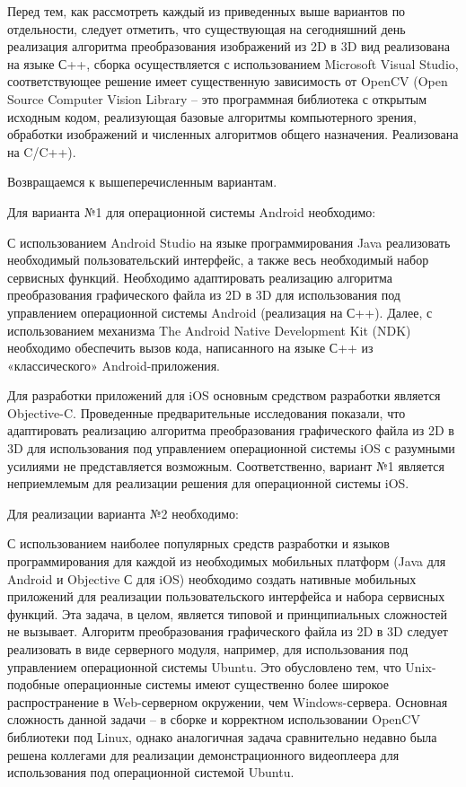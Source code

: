 Перед тем, как рассмотреть каждый из приведенных выше вариантов по отдельности, следует отметить, что существующая на сегодняшний день реализация алгоритма преобразования изображений из 2D в 3D вид реализована на языке С++, сборка осуществляется с использованием Microsoft Visual Studio, соответствующее решение имеет существенную зависимость от OpenCV (Open Source Computer Vision Library – это программная библиотека с открытым исходным кодом, реализующая базовые алгоритмы компьютерного зрения, обработки изображений и численных алгоритмов общего назначения. Реализована на C/C++).

Возвращаемся к вышеперечисленным вариантам.

Для варианта №1 для операционной системы Android необходимо:

С использованием Android Studio на языке программирования Java реализовать необходимый пользовательский интерфейс, а также весь необходимый набор сервисных функций. Необходимо адаптировать реализацию алгоритма преобразования графического файла из 2D в 3D для использования под управлением операционной системы Android (реализация на С++). Далее, с использованием механизма The Android Native Development Kit (NDK) необходимо обеспечить вызов кода, написанного на языке С++ из «классического» Android-приложения. 

Для разработки приложений для iOS основным средством разработки является Objective-C. Проведенные предварительные исследования показали, что адаптировать реализацию алгоритма преобразования графического файла из 2D в 3D для использования под управлением операционной системы iOS с разумными усилиями не представляется возможным. Соответственно, вариант №1 является неприемлемым для реализации решения для операционной системы iOS.

Для реализации варианта №2 необходимо:

С использованием наиболее популярных средств разработки и языков программирования для каждой из необходимых мобильных платформ (Java для Android и Objective С для iOS) необходимо создать нативные мобильных приложений для реализации пользовательского интерфейса и набора сервисных функций. Эта задача, в целом, является типовой и принципиальных сложностей не вызывает. Алгоритм преобразования графического файла из 2D в 3D следует реализовать в виде серверного модуля, например, для использования под управлением операционной системы Ubuntu. Это обусловлено тем, что Unix-подобные операционные системы имеют существенно более широкое распространение в Web-серверном окружении, чем Windows-сервера. Основная сложность данной задачи – в сборке и корректном использовании OpenCV библиотеки под Linux, однако аналогичная задача сравнительно недавно была решена коллегами для реализации демонстрационного видеоплеера для использования под операционной системой Ubuntu.

